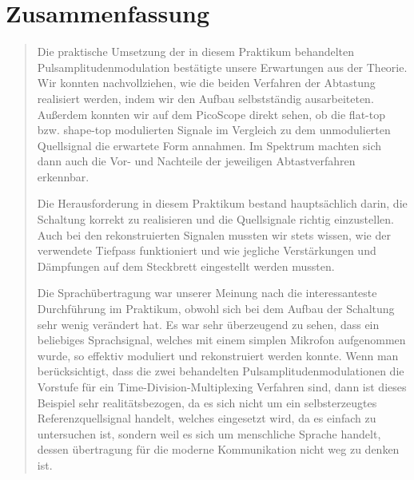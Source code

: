     \section{Zusammenfassung}
    \begin{quote}
	
    	Die praktische Umsetzung der in diesem Praktikum behandelten
    	Pulsamplitudenmodulation bestätigte unsere Erwartungen aus der Theorie. Wir
    	konnten nachvollziehen, wie die beiden Verfahren der Abtastung realisiert
    	werden, indem wir den Aufbau selbstständig ausarbeiteten. Außerdem konnten wir
    	auf dem PicoScope direkt sehen, ob die flat-top bzw. shape-top modulierten
    	Signale im Vergleich zu dem unmodulierten Quellsignal die erwartete Form
    	annahmen. Im Spektrum machten sich dann auch die Vor- und Nachteile der
    	jeweiligen Abtastverfahren erkennbar.
    	
    	\vspace{0.5em}
    	
    	Die Herausforderung in diesem Praktikum bestand hauptsächlich darin, die
    	Schaltung korrekt zu realisieren und die Quellsignale richtig einzustellen.
    	Auch bei den rekonstruierten Signalen mussten wir stets wissen, wie der verwendete 
    	Tiefpass funktioniert und wie jegliche Verstärkungen und Dämpfungen auf dem
    	Steckbrett eingestellt werden mussten.
    	
    	\vspace{0.5em}
    	
    	Die Sprachübertragung war unserer Meinung nach die interessanteste Durchführung
    	im Praktikum, obwohl sich bei dem Aufbau der Schaltung sehr wenig verändert
    	hat. Es war sehr überzeugend zu sehen, dass ein beliebiges Sprachsignal,
    	welches mit einem simplen Mikrofon aufgenommen wurde, so effektiv
    	moduliert und rekonstruiert werden konnte. Wenn man berücksichtigt, dass die
    	zwei behandelten Pulsamplitudenmodulationen die Vorstufe für ein Time-Division-Multiplexing
    	Verfahren sind, dann ist dieses Beispiel sehr realitätsbezogen, da es sich
    	nicht um ein selbsterzeugtes Referenzquellsignal handelt, welches
    	eingesetzt wird, da es einfach zu untersuchen ist, sondern weil es sich um
    	menschliche Sprache handelt, dessen übertragung für die moderne Kommunikation  
    	nicht weg zu denken ist.
	

    \end{quote}%
         



